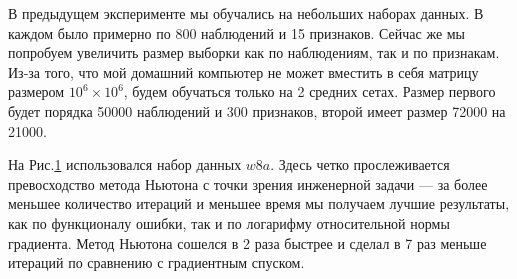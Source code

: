 \documentclass{article}
\begin{document}
	В предыдущем эксперименте мы обучались на небольших наборах данных. В каждом было примерно по 800 наблюдений и 15 признаков. Сейчас же мы попробуем увеличить размер выборки как по наблюдениям, так и по признакам. Из-за того, что мой домашний компьютер не может вместить в себя матрицу размером $10^6 \times 10^6$, будем обучаться только на 2 средних сетах. Размер первого будет порядка 50000 наблюдений и 300 признаков, второй имеет размер 72000 на 21000.
	
	
	\begin{figure}[H]
		\centering
		\hfill %
		\hfill %
		\caption{}
		\label{fig:w8a}
	\end{figure}
	
	На Рис.\ref{fig:w8a} использовался набор данных $w8a$. Здесь четко прослеживается превосходство метода Ньютона с точки зрения инженерной задачи --- за более меньшее количество итераций и меньшее время мы получаем лучшие результаты, как по функционалу ошибки, так и по логарифму относительной нормы градиента. Метод Ньютона сошелся в 2 раза быстрее и сделал в 7 раз меньше итераций по сравнению с градиентным спуском.
	
\end{document}
